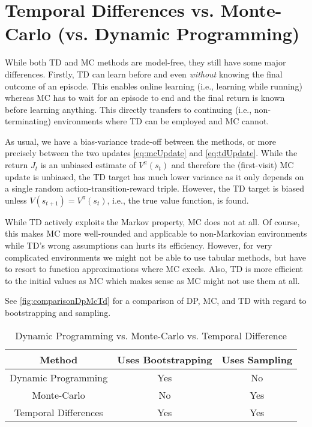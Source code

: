 	\section{Temporal Differences vs. Monte-Carlo (vs. Dynamic Programming)}
		While both \ac{TD} and \ac{MC} methods are model-free, they still have some major differences. Firstly, \ac{TD} can learn before and even \emph{without} knowing the final outcome of an episode. This enables online learning (i.e., learning while running) whereas \ac{MC} has to wait for an episode to end and the final return is known before learning anything. This directly transfers to continuing (i.e., non-terminating) environments where \ac{TD} can be employed and \ac{MC} cannot.

		As usual, we have a bias-variance trade-off between the methods, or more precisely between the two updates \eqref{eq:mcUpdate} and \eqref{eq:tdUpdate}. While the return \(J_t\) is an unbiased estimate of \(V^\pi(s_t)\) and therefore the (first-visit) \ac{MC} update is unbiased, the \ac{TD} target has much lower variance as it only depends on a single random action-transition-reward triple. However, the \ac{TD} target is biased unless \( V(s_{t + 1}) = V^\pi(s_t) \), i.e., the true value function, is found.

		While \ac{TD} actively exploits the Markov property, \ac{MC} does not at all. Of course, this makes \ac{MC} more well-rounded and applicable to non-Markovian environments while \ac{TD}'s wrong assumptions can hurts its efficiency. However, for very complicated environments we might not be able to use tabular methods, but have to resort to function approximations where \ac{MC} excels. Also, \ac{TD} is more efficient to the initial values as \ac{MC} which makes sense as \ac{MC} might not use them at all.

		See \autoref{fig:comparisonDpMcTd} for a comparison of \ac{DP}, \ac{MC}, and \ac{TD} with regard to bootstrapping and sampling.

		\begin{table}
			\centering
			\begin{tabular}{c|cc}
				\toprule
				\textbf{Method}      & \textbf{Uses Bootstrapping} & \textbf{Uses Sampling} \\ \midrule
				Dynamic Programming  & Yes                         & No                     \\
				Monte-Carlo          & No                          & Yes                    \\
				Temporal Differences & Yes                         & Yes                    \\ \bottomrule
			\end{tabular}
			\caption{Dynamic Programming vs. Monte-Carlo vs. Temporal Difference}
			\label{fig:comparisonDpMcTd}
		\end{table}

